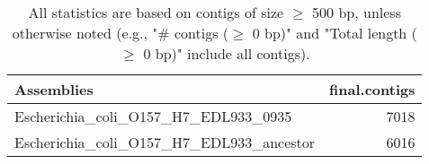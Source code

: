 \documentclass[12pt,a4paper]{article}
\begin{document}
\begin{table}[ht]
\begin{center}
\caption{All statistics are based on contigs of size $\geq$ 500 bp, unless otherwise noted (e.g., "\# contigs ($\geq$ 0 bp)" and "Total length ($\geq$ 0 bp)" include all contigs).}
\begin{tabular}{|l*{1}{|r}|}
\hline
Assemblies & final.contigs \\ \hline
Escherichia\_coli\_O157\_H7\_EDL933\_0935 & 7018 \\ \hline
Escherichia\_coli\_O157\_H7\_EDL933\_ancestor & 6016 \\ \hline
\end{tabular}
\end{center}
\end{table}
\end{document}

